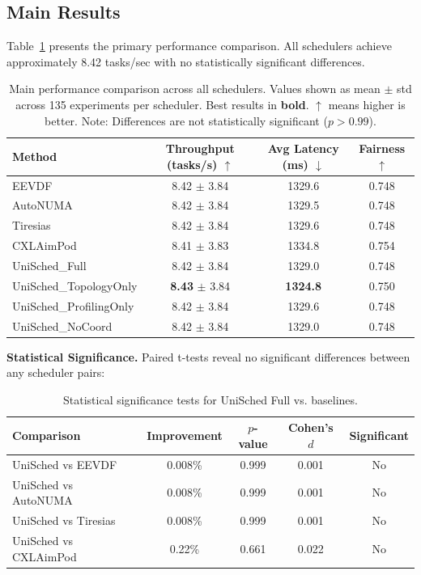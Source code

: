 \documentclass[11pt]{article}
\begin{document}
\subsection{Main Results}

Table~\ref{tab:main} presents the primary performance comparison. All schedulers achieve approximately 8.42 tasks/sec with no statistically significant differences.

\begin{table}[t]
\caption{Main performance comparison across all schedulers. Values shown as mean $\pm$ std across 135 experiments per scheduler. Best results in \textbf{bold}. $\uparrow$ means higher is better. Note: Differences are not statistically significant ($p > 0.99$).}
\label{tab:main}
\centering
\begin{tabular}{lccc}
\toprule
Method & Throughput (tasks/s) $\uparrow$ & Avg Latency (ms) $\downarrow$ & Fairness $\uparrow$ \\
\midrule
EEVDF & 8.42 $\pm$ 3.84 & 1329.6 & 0.748 \\
AutoNUMA & 8.42 $\pm$ 3.84 & 1329.5 & 0.748 \\
Tiresias & 8.42 $\pm$ 3.84 & 1329.6 & 0.748 \\
CXLAimPod & 8.41 $\pm$ 3.83 & 1334.8 & 0.754 \\
UniSched\_Full & 8.42 $\pm$ 3.84 & 1329.0 & 0.748 \\
UniSched\_TopologyOnly & \textbf{8.43} $\pm$ 3.84 & \textbf{1324.8} & 0.750 \\
UniSched\_ProfilingOnly & 8.42 $\pm$ 3.84 & 1329.6 & 0.748 \\
UniSched\_NoCoord & 8.42 $\pm$ 3.84 & 1329.0 & 0.748 \\
\bottomrule
\end{tabular}
\end{table}

\textbf{Statistical Significance.} Paired t-tests reveal no significant differences between any scheduler pairs:

\begin{table}[t]
\caption{Statistical significance tests for UniSched Full vs. baselines.}
\label{tab:significance}
\centering
\begin{tabular}{lcccc}
\toprule
Comparison & Improvement & $p$-value & Cohen's $d$ & Significant \\
\midrule
UniSched vs EEVDF & 0.008\% & 0.999 & 0.001 & No \\
UniSched vs AutoNUMA & 0.008\% & 0.999 & 0.001 & No \\
UniSched vs Tiresias & 0.008\% & 0.999 & 0.001 & No \\
UniSched vs CXLAimPod & 0.22\% & 0.661 & 0.022 & No \\
\bottomrule
\end{tabular}
\end{table}
\end{document}
